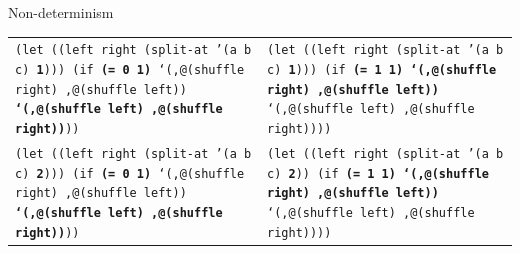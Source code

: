 \documentclass{beamer}
\begin{document}
\begin{frame}{Non-determinism}
  \tiny
  \begin{tabularx}{\textwidth}{ X X }
    \texttt{(let ((left right (split-at '(a b c)\newline
      \hphantom{\_\_\_\_\_\_\_\_\_\_\_\_\_\_\_\_\_\_\_}
      \textbf{1})))\newline
      \hphantom{\_\_}(if \textbf{(= 0 1)}\newline
      \hphantom{\_\_\_\_\_\_}`(,@(shuffle right)\newline
      \hphantom{ \_\_\_\_\_\_\_},@(shuffle left))\newline
      \hphantom{ \_\_\_\_}\textbf{`(,@(shuffle left)\newline
      \hphantom{ \_\_\_\_\_\_},@(shuffle right))}))\newline
      \ 
    }
    &
    \texttt{(let ((left right (split-at '(a b c)\newline
      \hphantom{\_\_\_\_\_\_\_\_\_\_\_\_\_\_\_\_\_\_\_}
      \textbf{1})))\newline
      \hphantom{\_\_}(if \textbf{(= 1 1)}\newline
      \hphantom{\_\_\_\_\_\_}\textbf{`(,@(shuffle right)\newline
      \hphantom{ \_\_\_\_\_\_\_},@(shuffle left))}\newline
      \hphantom{ \_\_\_\_}`(,@(shuffle left)\newline
      \hphantom{ \_\_\_\_\_\_},@(shuffle right))))\newline
      \ 
    }

    \\
    
    \texttt{(let ((left right (split-at '(a b c)\newline
      \hphantom{\_\_\_\_\_\_\_\_\_\_\_\_\_\_\_\_\_\_\_}
      \textbf{2})))\newline
      \hphantom{\_\_}(if \textbf{(= 0 1)}\newline
      \hphantom{\_\_\_\_\_\_}`(,@(shuffle right)\newline
      \hphantom{ \_\_\_\_\_\_\_},@(shuffle left))\newline
      \hphantom{ \_\_\_\_}\textbf{`(,@(shuffle left)\newline
      \hphantom{ \_\_\_\_\_\_},@(shuffle right))}))\newline
      \ 
    }
    &
    \texttt{(let ((left right (split-at '(a b c)\newline
      \hphantom{\_\_\_\_\_\_\_\_\_\_\_\_\_\_\_\_\_\_\_}
      \textbf{2}))\newline
      \hphantom{\_\_}(if \textbf{(= 1 1)}\newline
      \hphantom{\_\_\_\_\_\_}\textbf{`(,@(shuffle right)\newline
      \hphantom{ \_\_\_\_\_\_\_},@(shuffle left))}\newline
      \hphantom{ \_\_\_\_}`(,@(shuffle left)\newline
      \hphantom{ \_\_\_\_\_\_},@(shuffle right))))\newline
      \ 
    }

  \end{tabularx}
\end{frame}
\end{document}
